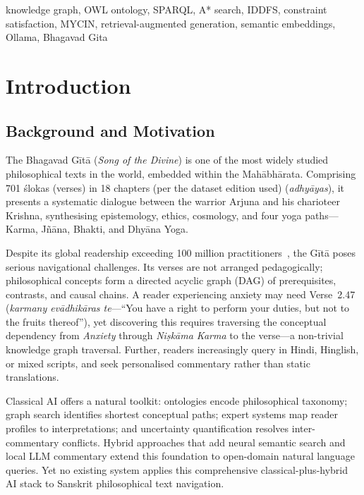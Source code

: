 \documentclass[conference]{IEEEtran}
\begin{document}
\begin{IEEEkeywords}
knowledge graph, OWL ontology, SPARQL, A* search, IDDFS, constraint satisfaction,
MYCIN, retrieval-augmented generation, semantic embeddings, Ollama, Bhagavad Gita
\end{IEEEkeywords}

\section{Introduction}

\subsection{Background and Motivation}

The Bhagavad G\={i}t\={a} (\textit{Song of the Divine}) is one of the most
widely studied philosophical texts in the world, embedded within the
Mah\={a}bh\={a}rata. Comprising 701 \'{s}lokas (verses) in 18 chapters (per the dataset edition used)
(\textit{adhy\={a}yas}), it presents a systematic dialogue between the warrior
Arjuna and his charioteer Krishna, synthesising epistemology, ethics, cosmology,
and four yoga paths—Karma, J\~{n}\={a}na, Bhakti, and Dhy\={a}na Yoga.

Despite its global readership exceeding 100 million practitioners~\cite{flood1996introduction},
the G\={i}t\={a} poses serious navigational challenges. Its verses are not arranged
pedagogically; philosophical concepts form a directed acyclic graph (DAG) of
prerequisites, contrasts, and causal chains. A reader experiencing anxiety may
need Verse~2.47 (\textit{karmany ev\={a}dhik\={a}ras te}—``You have a right to
perform your duties, but not to the fruits thereof''), yet discovering this
requires traversing the conceptual dependency from \textit{Anxiety} through
\textit{Ni\d{s}k\={a}ma Karma} to the verse—a non-trivial knowledge graph
traversal. Further, readers increasingly query in Hindi, Hinglish, or mixed
scripts, and seek personalised commentary rather than static translations.

Classical AI offers a natural toolkit: ontologies encode philosophical taxonomy;
graph search identifies shortest conceptual paths; expert systems map reader
profiles to interpretations; and uncertainty quantification resolves
inter-commentary conflicts. Hybrid approaches that add neural semantic search
and local LLM commentary extend this foundation to open-domain natural language
queries. Yet no existing system applies this comprehensive classical-plus-hybrid
AI stack to Sanskrit philosophical text navigation.
\end{document}
